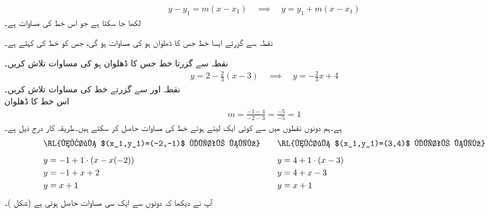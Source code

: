 \begin{align*}
y-y_1=m(x-x_1)\quad \implies \quad y=y_1+m(x-x_1)
\end{align*}
لکھا جا سکتا ہے جو اس خط کی مساوات ہے۔

نقطہ  سے گزرتے  ایسا خط جس کا  ڈھلوان  ہو کی مساوات  ہو گی، جس کو  خط کی  کہتے  ہے۔

نقطہ  سے گزرتا خط  جس کا ڈھلوان   ہو کی مساوات تلاش کریں۔\\
\begin{align*}
y=2-\frac{2}{3}(x-3)\quad \implies \quad y=-\frac{2}{3}x+4
\end{align*}
نقطہ  اور  سے گزرتے  خط کی مساوات تلاش کریں۔\\
اس خط کا  ڈھلوان
\begin{align*}
m=\frac{-1-4}{-2-3}=\frac{-5}{-5}=1
\end{align*}
ہے۔ہم دونوں نقطوں میں سے کوئی ایک لیتے ہوئے خط کی مساوات حاصل کر سکتے ہیں۔طریقہ کار درج ذیل ہے۔
\begin{gather*}
\begin{aligned}
&\text{\RL{نقطہ $(x_1,y_1)=(-2,-1)$ لیتے ہیں}}\\[0.5em]
&y=-1+1\cdot(x-x(-2))\\
&y=-1+x+2\\
&y=x+1
\end{aligned}\quad\quad
\begin{aligned}
&\text{\RL{نقطہ $(x_1,y_1)=(3,4)$ لیتے ہیں}}\\[0.5em]
&y=4+1\cdot(x-3)\\
&y=4+x-3\\
&y=x+1
\end{aligned}
\end{gather*}
آپ نے دیکھا کہ دونوں سے ایک  سی مساوات حاصل ہوتی ہے (شکل )۔
